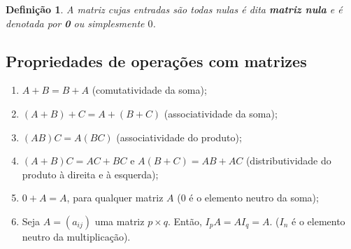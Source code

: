 \documentclass{article}
\newtheorem*{definition}{Definição}
\begin{document}
\begin{definition}
	A matriz cujas entradas são todas nulas é dita \textbf{matriz nula} e é denotada por \textbf{0} ou simplesmente $0$.
\end{definition}

\subsection{Propriedades de operações com matrizes}
\begin{enumerate}
	\item $A + B = B+A$ (comutatividade da soma);
	\item $(A+B)+C = A+(B+C)$ (associatividade da soma);
	\item $(AB)C = A(BC)$ (associatividade do produto);
	\item $(A+B)C = AC + BC$ e $A(B+C) = AB+AC$ (distributividade do produto à direita e à esquerda);
	\item $0+A = A$, para qualquer matriz $A$ ($0$ é o elemento neutro da soma);
	\item Seja $A = (a_{ij})$ uma matriz $p\times q$. Então, $I_pA = AI_q = A$. ($I_n$ é o elemento neutro da multiplicação).
\end{enumerate}
\end{document}
